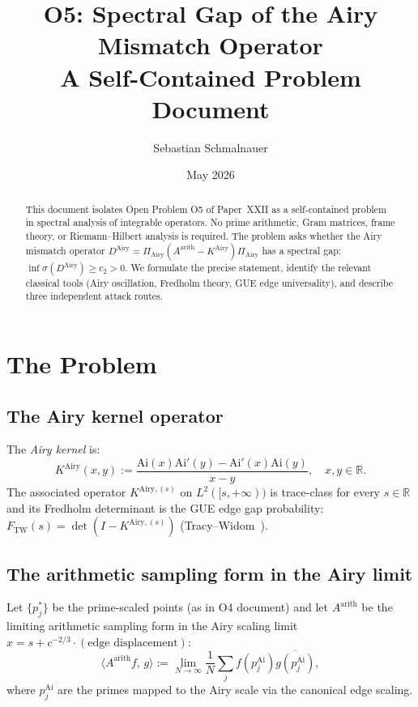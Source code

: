 \documentclass[12pt,a4paper]{amsart}
\title{O5: Spectral Gap of the Airy Mismatch Operator\\
{\normalsize A Self-Contained Problem Document}}
\author{Sebastian Schmalnauer}
\date{May 2026}
\theoremstyle{definition}
\newcommand{\Ai}{\mathrm{Ai}}
\newcommand{\KAi}{K^{\mathrm{Airy}}}
\newcommand{\DAi}{D^{\mathrm{Airy}}}
\newcommand{\PAi}{\Pi_{\mathrm{Airy}}}
\newcommand{\ip}[2]{\langle #1,\,#2\rangle}
\begin{document}
\maketitle

\begin{abstract}
This document isolates Open Problem O5 of Paper~XXII as a
self-contained problem in spectral analysis of integrable operators.
No prime arithmetic, Gram matrices, frame theory, or
Riemann--Hilbert analysis is required.
The problem asks whether the Airy mismatch operator
$\DAi = \PAi(A^{\mathrm{arith}} - \KAi)\PAi$
has a spectral gap: $\inf\sigma(\DAi) \ge c_2 > 0$.
We formulate the precise statement, identify the relevant classical
tools (Airy oscillation, Fredholm theory, GUE edge universality),
and describe three independent attack routes.
\end{abstract}

\tableofcontents

\section{The Problem}
\label{sec:problem}

\subsection{The Airy kernel operator}

The \emph{Airy kernel} is:
\[
  \KAi(x,y)
  := \frac{\Ai(x)\Ai'(y) - \Ai'(x)\Ai(y)}{x-y},
  \quad x,y \in \mathbb{R}.
\]
The associated operator $K^{\mathrm{Airy},(s)}$
on $L^2([s,+\infty))$ is trace-class for every $s \in \mathbb{R}$
and its Fredholm determinant is the GUE edge gap probability:
$F_{\mathrm{TW}}(s) = \det(I - K^{\mathrm{Airy},(s)})$ (Tracy--Widom~\cite{TracyWidom1994}).

\subsection{The arithmetic sampling form in the Airy limit}

Let $\{p_j^*\}$ be the prime-scaled points (as in O4 document)
and let $A^{\mathrm{arith}}$ be the limiting arithmetic
sampling form in the Airy scaling limit
$x = s + c^{-2/3}\cdot(\text{edge displacement})$:
\[
  \ip{A^{\mathrm{arith}} f}{g}
  := \lim_{N\to\infty}\frac{1}{N}
  \sum_j f(p_j^{\mathrm{Ai}}) \overline{g(p_j^{\mathrm{Ai}})},
\]
where $p_j^{\mathrm{Ai}}$ are the primes mapped to the
Airy scale via the canonical edge scaling.
\end{document}
